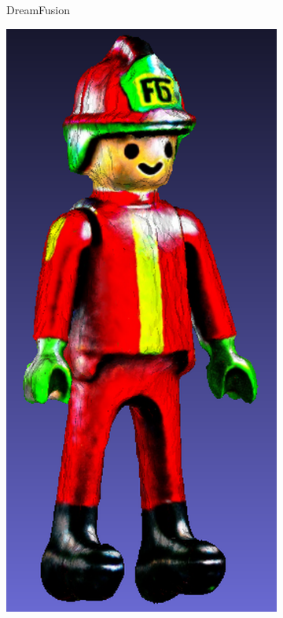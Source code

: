 \begin{figure}[ht]
\begin{subfigure}[b]{0.18\textwidth}
        \caption{DreamFusion}
    \end{subfigure}
    \begin{subfigure}[b]{0.179\textwidth}
        \centering
        \includegraphics[width=\textwidth]{etc/a high quality rendering of a playmobil firefighter/magic3d/magic3d_playmobil_result_resize.png}

\end{subfigure}
\end{figure}
